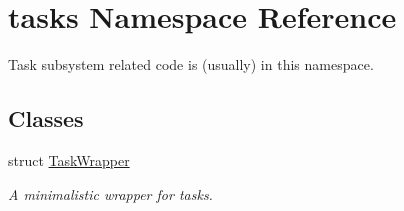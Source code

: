 \hypertarget{namespacetasks}{}\section{tasks Namespace Reference}
\label{namespacetasks}


Task subsystem related code is (usually) in this namespace.  


\subsection*{Classes}
\begin{DoxyCompactItemize}
\item 
struct \hyperlink{structtasks_1_1TaskWrapper}{Task\+Wrapper}
\begin{DoxyCompactList}\small\item\em A minimalistic wrapper for tasks. \end{DoxyCompactList}\end{DoxyCompactItemize}
